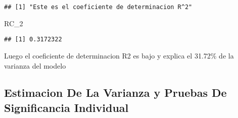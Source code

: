 \documentclass[
]{article}
\newenvironment{Shaded}{\begin{snugshade}}{\end{snugshade}}
\newcommand{\DecValTok}[1]{\textcolor[rgb]{0.00,0.00,0.81}{#1}}
\newcommand{\NormalTok}[1]{#1}
\begin{document}
\begin{verbatim}
## [1] "Este es el coeficiente de determinacion R^2"
\end{verbatim}

\begin{Shaded}
\begin{Highlighting}[]
\NormalTok{RC_}\DecValTok{2}
\end{Highlighting}
\end{Shaded}

\begin{verbatim}
## [1] 0.3172322
\end{verbatim}

Luego el coeficiente de determinacion R2 es bajo y explica el 31.72\% de
la varianza del modelo

\hypertarget{estimacion-de-la-varianza-y-pruebas-de-significancia-individual}{%
\subsection{Estimacion De La Varianza y Pruebas De Significancia
Individual}\label{estimacion-de-la-varianza-y-pruebas-de-significancia-individual}}
\end{document}
